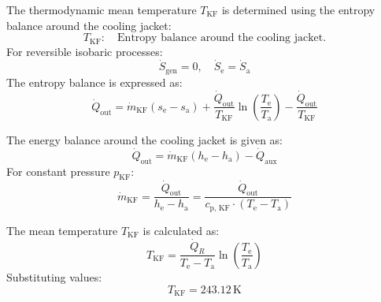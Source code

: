 The thermodynamic mean temperature \( T_{\text{KF}} \) is determined using the entropy balance around the cooling jacket:  
\[
T_{\text{KF}}: \quad \text{Entropy balance around the cooling jacket.}
\]  
For reversible isobaric processes:  
\[
\dot{S}_{\text{gen}} = 0, \quad \dot{S}_{\text{e}} = \dot{S}_{\text{a}}
\]  
The entropy balance is expressed as:  
\[
\dot{Q}_{\text{out}} = \dot{m}_{\text{KF}} \left( s_{\text{e}} - s_{\text{a}} \right) + \frac{\dot{Q}_{\text{out}}}{T_{\text{KF}}} \ln \left( \frac{T_{\text{e}}}{T_{\text{a}}} \right) - \frac{\dot{Q}_{\text{out}}}{T_{\text{KF}}}
\]  

The energy balance around the cooling jacket is given as:  
\[
\dot{Q}_{\text{out}} = \dot{m}_{\text{KF}} \left( h_{\text{e}} - h_{\text{a}} \right) - \dot{Q}_{\text{aux}}
\]  
For constant pressure \( p_{\text{KF}} \):  
\[
\dot{m}_{\text{KF}} = \frac{\dot{Q}_{\text{out}}}{h_{\text{e}} - h_{\text{a}}} = \frac{\dot{Q}_{\text{out}}}{c_{\text{p, KF}} \cdot (T_{\text{e}} - T_{\text{a}})}
\]  

The mean temperature \( T_{\text{KF}} \) is calculated as:  
\[
T_{\text{KF}} = \frac{\dot{Q}_R}{T_{\text{e}} - T_{\text{a}}} \ln \left( \frac{T_{\text{e}}}{T_{\text{a}}} \right)  
\]  
Substituting values:  
\[
T_{\text{KF}} = 243.12 \, \text{K}
\]